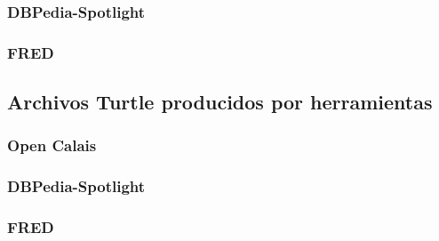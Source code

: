 \documentclass[spanish]{llncs}   %
\begin{document}
\subsubsection{DBPedia-Spotlight}\label{DBPediaRDF}
\subsubsection{FRED}\label{FREDRDF}
%
%
%

\subsection{Archivos Turtle producidos por herramientas}

\subsubsection{Open Calais}\label{OpenCalaisTurtle}
%
%
%

\subsubsection{DBPedia-Spotlight}\label{DBPediaTurtle}
\subsubsection{FRED}\label{FREDTurtle}
%
%
%
\end{document}
